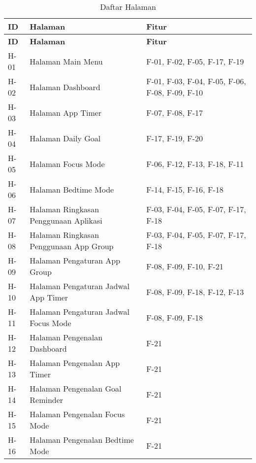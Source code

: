 \RaggedLeft
\begin{small}
\begin{longtable}[c]{|W{c}{0.06\textwidth}|>{\ccnormspacing}m{0.4\textwidth}|>{\ccnormspacing}m{0.4\textwidth}|}
  \caption{Daftar Halaman}
  \label{tab:daftar_halaman} \\
  \hline {}
  \textbf{ID} & \textbf{Halaman} & \textbf{Fitur} \\ \hline \endfirsthead
  \hline {}
  \textbf{ID} & \textbf{Halaman} & \textbf{Fitur} \\ \hline \endhead
  \hline \endfoot

  H-01 & Halaman Main Menu & F-01, F-02, F-05, F-17, F-19 \\ \hline
  H-02 & Halaman Dashboard & F-01, F-03, F-04, F-05, F-06, F-08, F-09, F-10 \\ \hline
  H-03 & Halaman App Timer & F-07, F-08, F-17 \\ \hline
  H-04 & Halaman Daily Goal & F-17, F-19, F-20 \\ \hline
  H-05 & Halaman Focus Mode & F-06, F-12, F-13, F-18, F-11 \\ \hline
  H-06 & Halaman Bedtime Mode & F-14, F-15, F-16, F-18 \\ \hline
  H-07 & Halaman Ringkasan Penggunaan Aplikasi & F-03, F-04, F-05, F-07, F-17, F-18 \\ \hline
  H-08 & Halaman Ringkasan Penggunaan App Group & F-03, F-04, F-05, F-07, F-17, F-18 \\ \hline
  H-09 & Halaman Pengaturan App Group & F-08, F-09, F-10, F-21 \\ \hline
  H-10 & Halaman Pengaturan Jadwal App Timer & F-08, F-09, F-18, F-12, F-13 \\ \hline
  H-11 & Halaman Pengaturan Jadwal Focus Mode & F-08, F-09, F-18 \\ \hline
  H-12 & Halaman Pengenalan Dashboard & F-21 \\ \hline
  H-13 & Halaman Pengenalan App Timer & F-21 \\ \hline
  H-14 & Halaman Pengenalan Goal Reminder & F-21 \\ \hline
  H-15 & Halaman Pengenalan Focus Mode & F-21 \\ \hline
  H-16 & Halaman Pengenalan Bedtime Mode & F-21 \\ \hline

\end{longtable}
\end{small}
\justifying
\FloatBarrier

